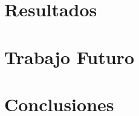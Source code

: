 \documentclass[10pt, a4paper, twocolumn]{article}
\begin{document}
\section{Resultados}

\section{Trabajo Futuro}

\section{Conclusiones}

\printbibliography[{title = "example.bib" }] %

\end{document}
